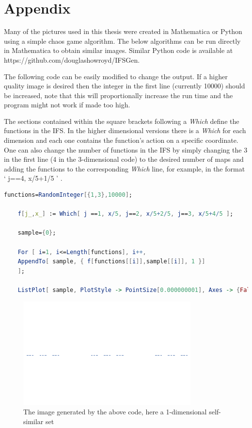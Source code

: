 \chapter*{Appendix}

Many of the pictures used in this thesis were created in Mathematica or Python using a simple chaos game algorithm. The below algorithms can be run directly in Mathematica to obtain similar images. Similar Python code is available at https://github.com/douglashowroyd/IFSGen.

The following code can be easily modified to change the output. If a higher quality image is desired then the integer in the first line (currently 10000) should be increased, note that this will proportionally increase the run time and the program might not work if made too high. 

The sections contained within the square brackets following a \textit{Which} define the functions in the IFS. In the higher dimensional versions there is a \textit{Which} for each dimension and each one contains the function's action on a specific coordinate. One can also change the number of functions in the IFS by simply changing the 3 in the first line (4 in the 3-dimensional code) to the desired number of maps and adding the functions to the corresponding \textit{Which} line, for example, in the format  ` j==4, x/5+1/5 ' .

 
 
  \begin{lstlisting}[language=Mathematica,title={Mathematica code for 1-dimensional images}]
    functions=RandomInteger[{1,3},10000];
    
    f[j_,x_] := Which[ j ==1, x/5, j==2, x/5+2/5, j==3, x/5+4/5 ];
    
    sample={0};
    
    For [ i=1, i<=Length[functions], i++, 
    AppendTo[ sample, { f[functions[[i]],sample[[i]], 1 }] 
    ];
    
    ListPlot[ sample, PlotStyle -> PointSize[0.000000001], Axes -> {False,False}]
  \end{lstlisting}
  
  \begin{figure}[htb]
        \centering
        \includegraphics[width=0.3\linewidth]{pics/appendix/1-d_mathematica.png}
        \caption*{The image generated by the above code, here a 1-dimensional self-similar set}
    \end{figure}
  
